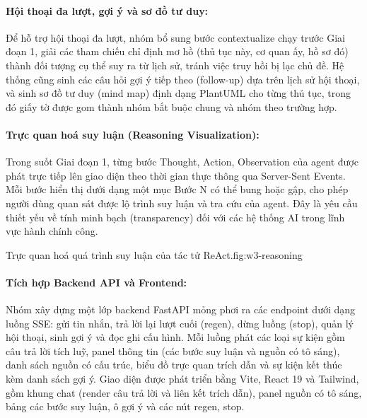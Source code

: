 \documentclass[11pt]{article}
\begin{document}
\paragraph{Hội thoại đa lượt, gợi ý và sơ đồ tư duy: }
Để hỗ trợ hội thoại đa lượt, nhóm bổ sung bước contextualize chạy trước Giai đoạn 1, giải các
tham chiếu chỉ định mơ hồ (thủ tục này, cơ quan ấy, hồ sơ đó) thành đối tượng cụ thể suy ra từ
lịch sử, tránh việc truy hồi bị lạc chủ đề. Hệ thống cũng sinh các câu hỏi gợi ý tiếp theo
(follow-up) dựa trên lịch sử hội thoại, và sinh sơ đồ tư duy (mind map) định dạng PlantUML cho
từng thủ tục, trong đó giấy tờ được gom thành nhóm bắt buộc chung và nhóm theo trường hợp.


\paragraph{Trực quan hoá suy luận (Reasoning Visualization): }
Trong suốt Giai đoạn 1, từng bước Thought, Action, Observation của agent được phát trực tiếp
lên giao diện theo thời gian thực thông qua Server-Sent Events. Mỗi bước hiển thị dưới dạng một
mục Bước N có thể bung hoặc gập, cho phép người dùng quan sát được lộ trình suy luận và tra cứu
của agent. Đây là yêu cầu thiết yếu về tính minh bạch (transparency) đối với các hệ thống AI
trong lĩnh vực hành chính công.

%
{Trực quan hoá quá trình suy luận của tác tử ReAct.}{fig:w3-reasoning}

\paragraph{Tích hợp Backend API và Frontend: }
Nhóm xây dựng một lớp backend FastAPI mỏng phơi ra các endpoint dưới dạng luồng SSE: gửi tin
nhắn, trả lời lại lượt cuối (regen), dừng luồng (stop), quản lý hội thoại, sinh gợi ý và đọc
ghi cấu hình. Mỗi luồng phát các loại sự kiện gồm câu trả lời tích luỹ, panel thông tin (các
bước suy luận và nguồn có tô sáng), danh sách nguồn có cấu trúc, biểu đồ trực quan trích dẫn và
sự kiện kết thúc kèm danh sách gợi ý. Giao diện được phát triển bằng Vite, React 19 và Tailwind,
gồm khung chat (render câu trả lời và liên kết trích dẫn), panel nguồn có tô sáng, bảng các
bước suy luận, ô gợi ý và các nút regen, stop.
\end{document}
